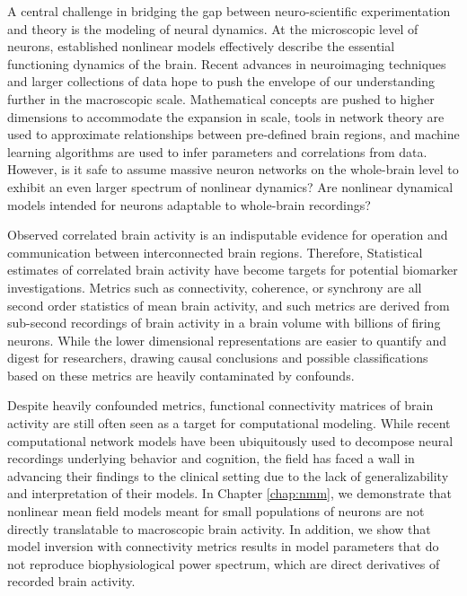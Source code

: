 A central challenge in bridging the gap between neuro-scientific experimentation and theory is the modeling of neural dynamics. At the microscopic level of neurons, established nonlinear models effectively describe the essential functioning dynamics of the brain. Recent advances in neuroimaging techniques and larger collections of data hope to push the envelope of our understanding further in the macroscopic scale. Mathematical concepts are pushed to higher dimensions to accommodate the expansion in scale, tools in network theory are used to approximate relationships between pre-defined brain regions, and machine learning algorithms are used to infer parameters and correlations from data. However, is it safe to assume massive neuron networks on the whole-brain level to exhibit an even larger spectrum of nonlinear dynamics? Are nonlinear dynamical models intended for neurons adaptable to whole-brain recordings?

Observed correlated brain activity is an indisputable evidence for operation and communication between interconnected brain regions. Therefore, Statistical estimates of correlated brain activity have become targets for potential biomarker investigations. Metrics such as connectivity, coherence, or synchrony are all second order statistics of mean brain activity, and such metrics are derived from sub-second recordings of brain activity in a brain volume with billions of firing neurons. While the lower dimensional representations are easier to quantify and digest for researchers, drawing causal conclusions and possible classifications based on these metrics are heavily contaminated by confounds. 

Despite heavily confounded metrics, functional connectivity matrices of brain activity are still often seen as a target for computational modeling. While recent computational network models have been ubiquitously used to decompose neural recordings underlying behavior and cognition, the field has faced a wall in advancing their findings to the  clinical setting due to the lack of generalizability and interpretation of their models. In Chapter \ref{chap:nmm}, we demonstrate that nonlinear mean field models meant for small populations of neurons are not directly translatable to macroscopic brain activity. In addition, we show that model inversion with connectivity metrics results in model parameters that do not reproduce biophysiological power spectrum, which are direct derivatives of recorded brain activity. 

